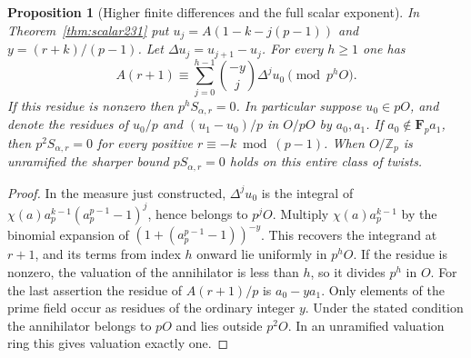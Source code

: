 \documentclass[a4paper,11pt]{article}
\newtheorem{proposition}{Proposition}[section]
\theoremstyle{definition}
\theoremstyle{remark}
\newcommand{\ZZ}{\mathbb Z}\newcommand{\ord}{\operatorname{ord}}
\numberwithin{equation}{section}
\begin{document}
\begin{proposition}[Higher finite differences and the full scalar exponent]
\label{prop:digits231}
In Theorem~\ref{thm:scalar231} put \(u_j=A(1-k-j(p-1))\) and
\(y=(r+k)/(p-1)\). Let \(\Delta u_j=u_{j+1}-u_j\). For every
\(h\ge1\) one has
\[
 A(r+1)\equiv\sum_{j=0}^{h-1}\binom{-y}{j}\Delta^ju_0
                          \pmod {p^hO}.
\]
If this residue is nonzero then \(p^hS_{\alpha,r}=0\).
In particular suppose \(u_0\in pO\), and denote the residues of
\(u_0/p\) and \((u_1-u_0)/p\) in \(O/pO\) by \(a_0,a_1\).
If \(a_0\notin\mathbf F_p a_1\), then
\(p^2S_{\alpha,r}=0\) for every positive \(r\equiv-k\bmod(p-1)\).
When \(O/\ZZ_p\) is unramified the sharper bound
\(pS_{\alpha,r}=0\) holds on this entire class of twists.
\end{proposition}
\begin{proof}
In the measure just constructed, \(\Delta^ju_0\) is the integral
of \(\chi(a)a_p^{k-1}(a_p^{p-1}-1)^j\), hence belongs to \(p^jO\).
Multiply \(\chi(a)a_p^{k-1}\) by the binomial expansion of
\((1+(a_p^{p-1}-1))^{-y}\). This recovers the integrand at
\(r+1\), and its terms from index \(h\) onward lie uniformly in
\(p^hO\). If the residue is nonzero, the valuation of the
annihilator is less than \(h\), so it divides \(p^h\) in \(O\).
For the last assertion the residue of \(A(r+1)/p\) is
\(a_0-ya_1\). Only elements of the prime field occur as residues
of the ordinary integer \(y\). Under the stated condition the
annihilator belongs to \(pO\) and lies outside \(p^2O\). In an
unramified valuation ring this gives valuation exactly one.
\end{proof}
\end{document}

